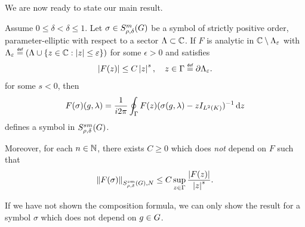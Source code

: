 We are now ready to state our main result.
\begin{theorem}
\label{theorem:functional_calculus}
    Assume $0 \leq \delta < \delta \leq 1$.
    Let $\sigma \in S^{m}_{\rho, \delta}(G)$ be a symbol of strictly positive order,
    parameter-elliptic with respect to a sector $\Lambda \subset \mathbb{C}$.
    If $F$ is analytic in $\mathbb{C} \setminus \Lambda_\varepsilon$
    with $\Lambda_\epsilon \defeq (\Lambda \cup \{z \in \C : \abs z \leq \epsilon\})$ for some $\epsilon > 0$
    and satisfies
    \begin{align*}
        \abs {F(z)} \leq C \abs z^s, \quad z \in \Gamma \defeq \partial \Lambda_\epsilon.
    \end{align*}
    for some $s < 0$,
    then
    \begin{align*}
        F(\sigma)(g, \lambda)
        = \frac 1 {i 2 \pi} \oint_{\Gamma} F(z) (\sigma(g, \lambda) - z {I_{{L^{2} (K)}}})^{-1} \,\mathrm{d} z
    \end{align*}
    defines a symbol in $S^{s m}_{\rho, \delta}(G)$.

    Moreover,
    for each $n \in \mathbb{N}$,
    there exists $C \geq 0$ which does \emph{not} depend on $F$ such that
    \begin{align}
        \SymbolSemiNorm {s m} {\rho, \delta} N {F(\sigma)} \leq C \sup_{z \in \Gamma} \frac {\abs {F(z)}} {\abs z^s}.
        \label{eq:functional_calculus:bound_on_seminorm}
    \end{align}

    If we have not shown the composition formula,
    we can only show the result for a symbol $\sigma$ which does not depend on $g \in G$.
\end{theorem}
